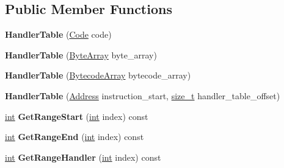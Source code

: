 \subsection*{Public Member Functions}
\begin{DoxyCompactItemize}
\item 
\mbox{\label{classv8_1_1internal_1_1HandlerTable_a6ad1bfe95887812c0d15581c5ef879e3}} 
{\bfseries Handler\+Table} (\mbox{\hyperlink{classv8_1_1internal_1_1Code}{Code}} code)
\item 
\mbox{\label{classv8_1_1internal_1_1HandlerTable_ae5e000c6fddabb6f01d198649d6f1ca2}} 
{\bfseries Handler\+Table} (\mbox{\hyperlink{classv8_1_1internal_1_1ByteArray}{Byte\+Array}} byte\+\_\+array)
\item 
\mbox{\label{classv8_1_1internal_1_1HandlerTable_a0590dd422cffa3762881f1e7cf500aad}} 
{\bfseries Handler\+Table} (\mbox{\hyperlink{classv8_1_1internal_1_1BytecodeArray}{Bytecode\+Array}} bytecode\+\_\+array)
\item 
\mbox{\label{classv8_1_1internal_1_1HandlerTable_acb3d169c3e9ff1311064b5f9b54071ce}} 
{\bfseries Handler\+Table} (\mbox{\hyperlink{classuintptr__t}{Address}} instruction\+\_\+start, \mbox{\hyperlink{classsize__t}{size\+\_\+t}} handler\+\_\+table\+\_\+offset)
\item 
\mbox{\label{classv8_1_1internal_1_1HandlerTable_a05744150128a020122d6d23805c1a789}} 
\mbox{\hyperlink{classint}{int}} {\bfseries Get\+Range\+Start} (\mbox{\hyperlink{classint}{int}} index) const
\item 
\mbox{\label{classv8_1_1internal_1_1HandlerTable_abf3582125d7138dc1c00c393a7cb9522}} 
\mbox{\hyperlink{classint}{int}} {\bfseries Get\+Range\+End} (\mbox{\hyperlink{classint}{int}} index) const
\item 
\mbox{\label{classv8_1_1internal_1_1HandlerTable_a51070059fac161f9b25200f5839b6ec5}} 
\mbox{\hyperlink{classint}{int}} {\bfseries Get\+Range\+Handler} (\mbox{\hyperlink{classint}{int}} index) const
\item 

\end{DoxyCompactItemize}
